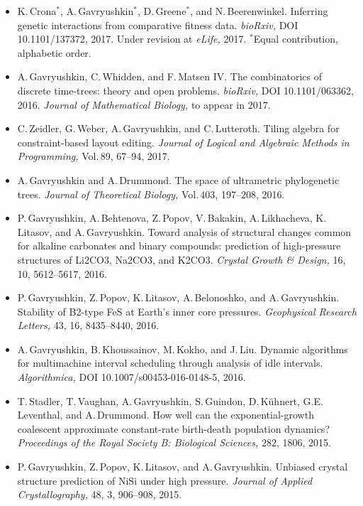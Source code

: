 \documentclass[12pt]{article}
\begin{document}
\iftoggle{full}{
\centerline{\bf Publications}
}{
\newpage
\centerline{\bf Recent publications}
}
\begin{itemize}
\item K.\,Crona$^*$, A.\,Gavryushkin$^*$, D.\,Greene$^*$, and N.\,Beerenwinkel.
	Inferring genetic interactions from comparative fitness data.
	{\em bioRxiv,} DOI 10.1101/137372, 2017.
	Under revision at {\em eLife,} 2017.
	$^*$Equal contribution, alphabetic order.
\item A.\,Gavryushkin, C.\,Whidden, and F.\,Matsen IV.
	The combinatorics of discrete time-trees: theory and open problems.
	{\em bioRxiv,} DOI 10.1101/063362, 2016.
	{\em Journal of Mathematical Biology,} to appear in 2017.
\item C.\,Zeidler, G.\,Weber, A.\,Gavryushkin, and C.\,Lutteroth.
	Tiling algebra for constraint-based layout editing.
	{\em Journal of Logical and Algebraic Methods in Programming,} Vol.\,89, 67--94, 2017.
\item A.\,Gavryushkin and A.\,Drummond.
	The space of ultrametric phylogenetic trees.
	{\em Journal of Theoretical Biology,} Vol.\,403, 197--208, 2016.
\item P.\,Gavryushkin, A.\,Behtenova, Z.\,Popov, V.\,Bakakin, A.\,Likhacheva, K.\,Litasov, and A.\,Gavryushkin.
	Toward analysis of structural changes common for alkaline carbonates and binary compounds: prediction of high-pressure structures of Li2CO3, Na2CO3, and K2CO3.
	{\em Crystal Growth \& Design,} 16, 10, 5612--5617, 2016.
\item P.\,Gavryushkin, Z.\,Popov, K.\,Litasov, A.\,Belonoshko, and A.\,Gavryushkin.
	Stability of B2-type FeS at Earth's inner core pressures.
	{\em Geophysical Research Letters,} 43, 16, 8435--8440, 2016.
\item A.\,Gavryushkin, B.\,Khoussainov, M.\,Kokho, and J.\,Liu.
	Dynamic algorithms for multimachine interval scheduling through analysis of idle intervals.
	{\em Algorithmica,} DOI 10.1007/s00453-016-0148-5, 2016.
\item T.\,Stadler, T.\,Vaughan, A.\,Gavryushkin, S.\,Guindon, D.\,K\"uhnert, G.E.\,Leventhal, and A.\,Drummond.
	How well can the exponential-growth coalescent approximate constant-rate birth-death population dynamics?
	{\em Proceedings of the Royal Society B: Biological Sciences,} 282, 1806, 2015.
\item P.\,Gavryushkin, Z.\,Popov, K.\,Litasov, and A.\,Gavryushkin.
	Unbiased crystal structure prediction of $\mathrm{NiSi}$ under high pressure.
	{\em Journal of Applied Crystallography,} 48, 3, 906--908, 2015.

\end{itemize}
\end{document}
